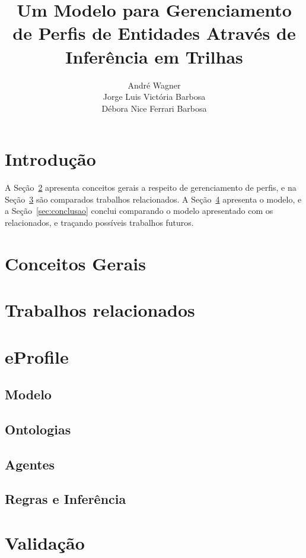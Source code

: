 \documentclass[a4paper,twocolumn]{article}
\author{André Wagner \\ Jorge Luis Victória Barbosa \\ Débora Nice Ferrari Barbosa}
\title{Um Modelo para Gerenciamento de Perfis de Entidades Através de Inferência em Trilhas}
\date{}
\begin{document}
\maketitle

\section{Introdução}
\label{sec:introducao}


A Seção~\ref{sec:conceitos} apresenta conceitos gerais a respeito de gerenciamento de perfis, e na Seção~\ref{sec:relacionados} são comparados trabalhos relacionados. A Seção~\ref{sec:eprofile} apresenta o modelo, e a Seção~\ref{sec:conclusao} conclui comparando o modelo apresentado com os relacionados, e traçando possíveis trabalhos futuros.

\section{Conceitos Gerais}
\label{sec:conceitos}


\section{Trabalhos relacionados}
\label{sec:relacionados}


\section{eProfile}
\label{sec:eprofile}


  \subsection{Modelo}
  \label{sec:modelo}
  

  \subsection{Ontologias}
  \label{sec:ontologias}
  

  \subsection{Agentes}
  \label{sec:agentes}
  

  \subsection{Regras e Inferência}
  \label{sec:inferencia}
  

\section{Validação}
\label{sec:validacao}


%



\begin{small}
  
\end{small}
\end{document}
